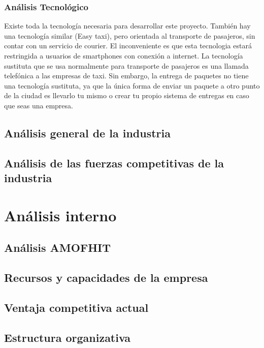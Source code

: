 \subsubsection{Análisis Tecnológico}
Existe toda la tecnología necesaria para desarrollar este proyecto. También hay una tecnología similar (Easy taxi), pero orientada al transporte de pasajeros, sin contar con un servicio de courier. El inconveniente es que esta tecnologia estará restringida a usuarios de smartphones con conexión a internet. La tecnología sustituta que se usa normalmente para transporte de pasajeros es una llamada telefónica a las empresas de taxi. Sin embargo, la entrega de paquetes no tiene una tecnología sustituta, ya que la única forma de enviar un paquete a otro punto de la ciudad es llevarlo tu mismo o crear tu propio sistema de entregas en caso que seas una empresa.


\subsection{Análisis general de la industria}
\subsection{Análisis de las fuerzas competitivas de la industria}

\section{Análisis interno}

\subsection{Análisis AMOFHIT}
\subsection{Recursos y capacidades de la empresa}
\subsection{Ventaja competitiva actual}
\subsection{Estructura organizativa}